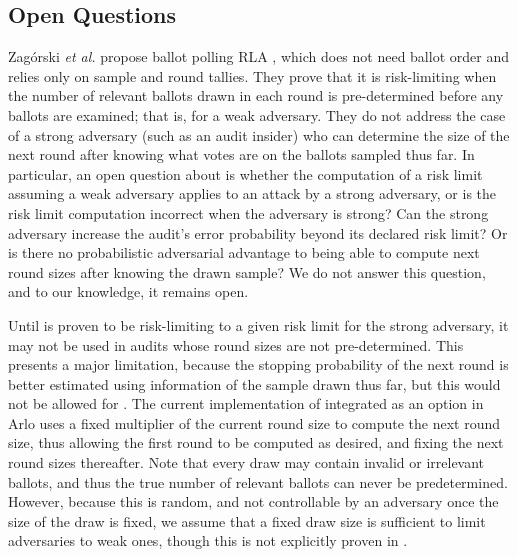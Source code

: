\subsection{Open Questions}
Zag\'{o}rski {\em et al.} propose ballot polling RLA \Minerva \cite{usenix_minerva}, which does not need ballot order and relies only on sample and round tallies. They prove that it is risk-limiting when the number of relevant ballots drawn in each round is pre-determined before any ballots are examined; that is, for a weak adversary. They do not address the case of a strong adversary (such as an audit insider) who can determine the size of the next round after knowing what votes are on the ballots sampled thus far. In particular, an open question about \Minerva is whether the computation of a risk limit assuming a weak adversary applies to an attack by a strong adversary, or is the risk limit computation incorrect when the adversary is strong? Can the strong adversary increase the audit's error probability beyond its declared risk limit? Or is there no probabilistic adversarial advantage to being able to compute next round sizes after knowing the drawn sample? We do not answer this question, and to our knowledge, it remains open. 

Until \Minerva is proven to be risk-limiting to a given risk limit for the strong adversary, it may not be used in audits whose round sizes are not pre-determined. This presents a major limitation, because the stopping probability of the next round is better estimated using information of the sample drawn thus far, but this would not be allowed for \Minerva. The current implementation of \Minerva integrated as an option in Arlo uses a fixed multiplier of the current round size to compute the next round size, thus allowing the first round to be computed as desired, and fixing the next round sizes thereafter. Note that every draw may contain invalid or irrelevant ballots, and thus the true number of relevant ballots can never be predetermined. However, because this is random, and not controllable by an adversary once the size of the draw is fixed, we assume that a fixed draw size is sufficient to limit adversaries to weak ones, though this is not explicitly proven in \cite{usenix_minerva}. 


